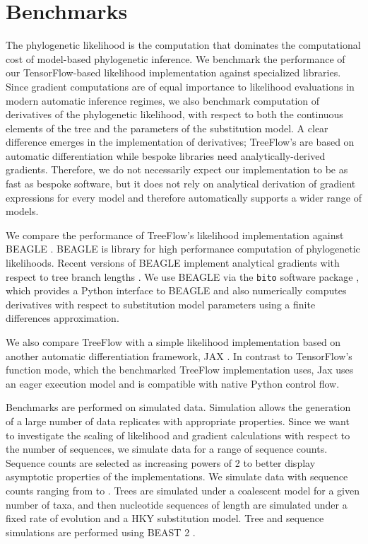 \section{Benchmarks}

The phylogenetic likelihood is the computation that dominates the computational cost of model-based phylogenetic inference. We benchmark the performance of our TensorFlow-based likelihood implementation against specialized libraries. Since gradient computations are of equal importance to likelihood evaluations in modern automatic inference regimes, we also benchmark computation of derivatives of the phylogenetic likelihood, with respect to both the continuous elements of the tree and the parameters of the substitution model. A clear difference emerges in the implementation of derivatives; TreeFlow's are based on automatic differentiation while bespoke libraries need analytically-derived gradients. Therefore, we do not necessarily expect our implementation to be as fast as bespoke software, but it does not rely on analytical derivation of gradient expressions for every model and therefore automatically supports a wider range of models.

We compare the performance of TreeFlow's likelihood implementation against BEAGLE \cite{ayres2019beagle}. BEAGLE is library for high performance computation of phylogenetic likelihoods. Recent versions of BEAGLE implement analytical gradients with respect to tree branch lengths \cite{ji2020gradients}. We use BEAGLE via the \texttt{bito} software package \cite{bito}, which provides a Python interface to BEAGLE and also numerically computes derivatives with respect to substitution model parameters using a finite differences approximation.

We also compare TreeFlow with a simple likelihood implementation \cite{phylojax} based on another automatic differentiation framework, JAX \cite{jax2018github}. In contrast to TensorFlow's function mode, which the benchmarked TreeFlow implementation uses, Jax uses an eager execution model and is compatible with native Python control flow.

Benchmarks are performed on simulated data. Simulation allows the generation of a large number of data replicates with appropriate properties. Since we want to investigate the scaling of likelihood and gradient calculations with respect to the number of sequences, we simulate data for a range of sequence counts. Sequence counts are selected as increasing powers of 2 to better display asymptotic properties of the implementations. We simulate data with sequence counts ranging from  to . Trees are simulated under a coalescent model for a given number of taxa, and then nucleotide sequences of length  are simulated under a fixed rate of evolution and a HKY substitution model. Tree and sequence simulations are performed using BEAST 2 \cite{bouckaert2019beast}.

